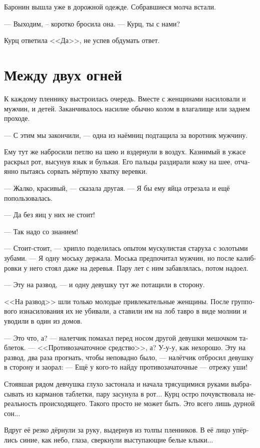 \documentclass[a4paper,12pt,fleqn]{book}\usepackage{polyglossia}\setdefaultlanguage[babelshorthands=true]{russian}\setotherlanguage{english}\defaultfontfeatures{Ligatures=TeX,Mapping=tex-text}\usepackage{xcolor}\newcommand{\ml}[3]{#2}
\begin{document}
Баронин вышла уже в дорожной одежде.
Собравшиеся молча встали.

--- Выходим, -- коротко бросила она.
--- Курц, ты с нами?

Курц ответила <<Да>>, не успев обдумать ответ.

\section{Между двух огней}

К каждому пленнику выстроилась очередь.
Вместе с женщинами насиловали и мужчин, и детей.
Заканчивалось насилие обычно колом в влагалище или заднем проходе.

--- С этим мы закончили, --- одна из наёмниц подтащила за воротник мужчину.

Ему тут же набросили петлю на шею и вздернули в воздух.
Казнимый в ужасе раскрыл рот, высунув язык и булькая.
Его пальцы раздирали кожу на шее, отчаянно пытаясь сорвать мёртвую хватку веревки.

--- Жалко, красивый, --- сказала другая.
--- Я бы ему яйца отрезала и ещё попользовалась.

--- Да без яиц у них не стоит!

--- Так надо со знанием!

--- Стоит-стоит, --- хрипло поделилась опытом мускулистая старуха с золотыми зубами.
--- Я одну моську держала.
Моська предпочитал мужчин, но после калибровки у него стоял даже на деревья.
Пару лет с ним забавлялась, потом надоел.

--- Эту на развод, --- и одну девушку тут же потащили в сторону.

<<На развод>> шли только молодые привлекательные женщины.
После группового изнасилования их не убивали, а ставили им на лоб тавро в виде молнии и уводили в один из домов.

--- Это что, а? --- налетчик помахал перед носом другой девушки мешочком таблеток.
--- <<Противозачаточное средство>>, а?
У-у-у, как нехорошо.
Эту на развод, два раза прогнать, чтобы неповадно было, --- налётчик отбросил девушку в сторону и заорал:
--- Ещё у кого-то найду противозачаточные --- отрежу уши!

Стоявшая рядом девчушка глухо застонала и начала трясущимися руками выбрасывать из карманов таблетки, пару засунула в рот...
Курц остро почувствовала нереальность происходящего.
Такого просто не может быть.
Это всего лишь дурной сон...

Вдруг её резко дёрнули за руку, выдернув из толпы пленников.
В её лицо упёрлись синие, как небо, глаза, сверкнули выступающие белые клыки...
\end{document}
